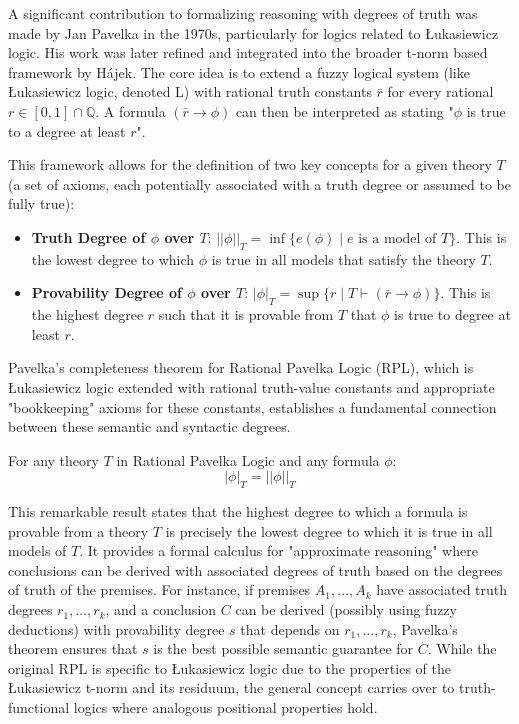 A significant contribution to formalizing reasoning with degrees of truth was made by Jan Pavelka in the 1970s, particularly for logics related to Łukasiewicz logic. His work was later refined and integrated into the broader t-norm based framework by Hájek. The core idea is to extend a fuzzy logical system (like Łukasiewicz logic, denoted L) with rational truth constants $\bar{r}$ for every rational $r \in [0,1] \cap \mathbb{Q}$. A formula $(\bar{r} \rightarrow \phi)$ can then be interpreted as stating "$\phi$ is true to a degree at least $r$".

This framework allows for the definition of two key concepts for a given theory $T$ (a set of axioms, each potentially associated with a truth degree or assumed to be fully true):

\begin{itemize}
    \item \textbf{Truth Degree of $\phi$ over $T$}: $||\phi||_T = \inf\{e(\phi) \mid e \text{ is a model of } T\}$. This is the lowest degree to which $\phi$ is true in all models that satisfy the theory $T$.
    \item \textbf{Provability Degree of $\phi$ over $T$}: $|\phi|_T = \sup\{r \mid T \vdash (\bar{r} \rightarrow \phi)\}$. This is the highest degree $r$ such that it is provable from $T$ that $\phi$ is true to degree at least $r$.
\end{itemize}

Pavelka's completeness theorem for Rational Pavelka Logic (RPL), which is Łukasiewicz logic extended with rational truth-value constants and appropriate "bookkeeping" axioms for these constants, establishes a fundamental connection between these semantic and syntactic degrees.

\begin{theorem}
For any theory $T$ in Rational Pavelka Logic and any formula $\phi$:
\[
 |\phi|_T = ||\phi||_T 
\]
\end{theorem}

This remarkable result states that the highest degree to which a formula is provable from a theory $T$ is precisely the lowest degree to which it is true in all models of $T$. It provides a formal calculus for "approximate reasoning" where conclusions can be derived with associated degrees of truth based on the degrees of truth of the premises. For instance, if premises $A_1, \ldots, A_k$ have associated truth degrees $r_1, \ldots, r_k$, and a conclusion $C$ can be derived (possibly using fuzzy deductions) with provability degree $s$ that depends on $r_1, \ldots, r_k$, Pavelka's theorem ensures that $s$ is the best possible semantic guarantee for $C$. While the original RPL is specific to Łukasiewicz logic due to the properties of the Łukasiewicz t-norm and its residuum, the general concept carries over to truth-functional logics where analogous positional properties hold.


